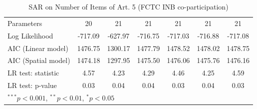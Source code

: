 \begin{table}[!h]
\begin{center}
\begin{tabular}{l c c c c c c }
Parameters              & 20           & 21           & 21           & 21           & 21           & 21           \\
Log Likelihood          & -717.09      & -627.97      & -716.75      & -717.03      & -716.88      & -717.08      \\
AIC (Linear model)      & 1476.75      & 1300.17      & 1477.79      & 1478.52      & 1478.02      & 1478.75      \\
AIC (Spatial model)     & 1474.18      & 1297.95      & 1475.50      & 1476.06      & 1475.76      & 1476.16      \\
LR test: statistic      & 4.57         & 4.23         & 4.29         & 4.46         & 4.25         & 4.59         \\
LR test: p-value        & 0.03         & 0.04         & 0.04         & 0.03         & 0.04         & 0.03         \\
\bottomrule
\multicolumn{7}{l}{\scriptsize{$^{***}p<0.001$, $^{**}p<0.01$, $^*p<0.05$}}
\end{tabular}
\caption{SAR on Number of Items of Art. 5 (FCTC INB co-participation)}
\label{table:coefficients}
\end{center}
\end{table}
